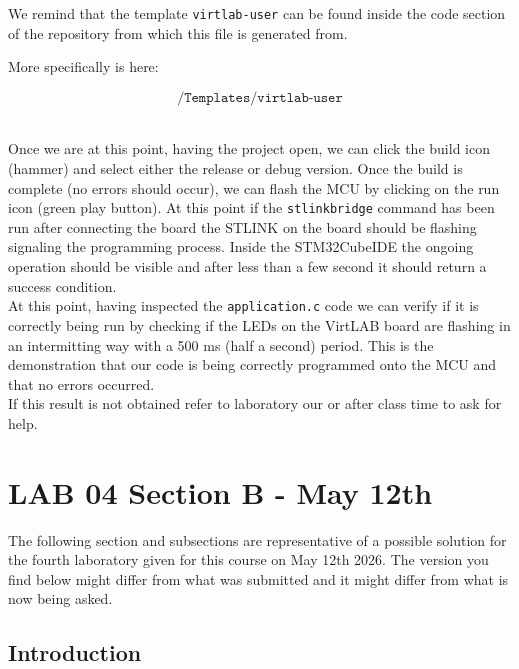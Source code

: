 \documentclass[../main.tex]{subfiles}
\begin{document}
We remind that the template \texttt{virtlab-user} can be found inside the code section of the repository from which this file is generated from.

More specifically is here:

\[ \texttt{/Templates/virtlab-user} \]\

Once we are at this point, having the project open, we can click the build icon (hammer) and select either the release or debug version. Once the build is complete (no errors should occur), we can flash the MCU by clicking on the run icon (green play button).
At this point if the \texttt{stlinkbridge} command has been run after connecting the board the STLINK on the board should be flashing signaling the programming process.
Inside the STM32CubeIDE the ongoing operation should be visible and after less than a few second it should return a success condition.\\

At this point, having inspected the \texttt{application.c} code we can verify if it is correctly being run by checking if the LEDs on the VirtLAB board are flashing in an intermitting way with a 500 ms (half a second) period.
This is the demonstration that our code is being correctly programmed onto the MCU and that no errors occurred.\\

If this result is not obtained refer to laboratory our or after class time to ask for help.\\


\clearpage
\thispagestyle{empty}

\vspace*{7cm}
\section{LAB 04 Section B - May 12th}
\vspace*{1.5cm}

The following section and subsections are representative of a possible solution for the fourth laboratory given for this course on May 12th 2026.
The version you find below might differ from what was submitted and it might differ from what is now being asked.


\vspace*{1cm}
\subsection{Introduction}
\end{document}
